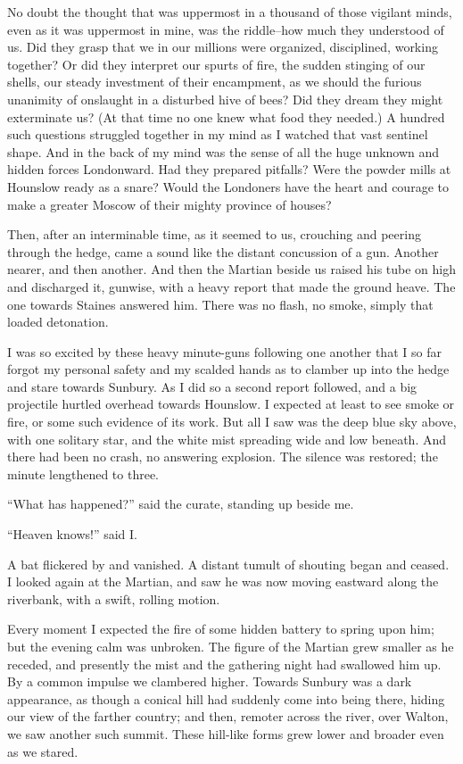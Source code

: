 No doubt the thought that was uppermost in a thousand of those
vigilant minds, even as it was uppermost in mine, was the
riddle--how much they understood of us. Did they grasp that we in
our millions were organized, disciplined, working together? Or did
they interpret our spurts of fire, the sudden stinging of our
shells, our steady investment of their encampment, as we should the
furious unanimity of onslaught in a disturbed hive of bees? Did
they dream they might exterminate us? (At that time no one knew
what food they needed.) A hundred such questions struggled together
in my mind as I watched that vast sentinel shape. And in the back
of my mind was the sense of all the huge unknown and hidden forces
Londonward. Had they prepared pitfalls? Were the powder mills at
Hounslow ready as a snare? Would the Londoners have the heart and
courage to make a greater Moscow of their mighty province of
houses?

Then, after an interminable time, as it seemed to us, crouching and
peering through the hedge, came a sound like the distant concussion
of a gun. Another nearer, and then another. And then the Martian
beside us raised his tube on high and discharged it, gunwise, with
a heavy report that made the ground heave. The one towards Staines
answered him. There was no flash, no smoke, simply that loaded
detonation.

I was so excited by these heavy minute-guns following one another
that I so far forgot my personal safety and my scalded hands as to
clamber up into the hedge and stare towards Sunbury. As I did so a
second report followed, and a big projectile hurtled overhead
towards Hounslow. I expected at least to see smoke or fire, or some
such evidence of its work. But all I saw was the deep blue sky
above, with one solitary star, and the white mist spreading wide
and low beneath. And there had been no crash, no answering
explosion. The silence was restored; the minute lengthened to
three.

``What has happened?'' said the curate, standing up beside me.

``Heaven knows!'' said I.

A bat flickered by and vanished. A distant tumult of shouting began
and ceased. I looked again at the Martian, and saw he was now
moving eastward along the riverbank, with a swift, rolling motion.

Every moment I expected the fire of some hidden battery to spring
upon him; but the evening calm was unbroken. The figure of the
Martian grew smaller as he receded, and presently the mist and the
gathering night had swallowed him up. By a common impulse we
clambered higher. Towards Sunbury was a dark appearance, as though
a conical hill had suddenly come into being there, hiding our view
of the farther country; and then, remoter across the river, over
Walton, we saw another such summit. These hill-like forms grew
lower and broader even as we stared.

